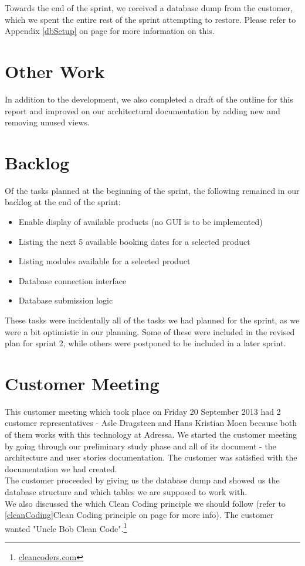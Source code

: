 Towards the end of the sprint, we received a database dump from the customer, which we spent the entire rest of the sprint attempting to restore. Please refer to Appendix \ref{dbSetup} on page \pageref{dbSetup} for more information on this.

\section{Other Work}
In addition to the development, we also completed a draft of the outline for this report and improved on our architectural documentation by adding new and removing unused views.

\section{Backlog}
Of the tasks planned at the beginning of the sprint, the following remained in our backlog at the end of the sprint:
\begin{itemize}
	\item Enable display of available products (no GUI is to be implemented)
	\item Listing the next 5 available booking dates for a selected product
	\item Listing modules available for a selected product
	\item Database connection interface
	\item Database submission logic
\end{itemize}

These tasks were incidentally all of the tasks we had planned for the sprint, as we were a bit optimistic in our planning. Some of these were included in the revised plan for sprint 2, while others were postponed to be included in a later sprint.

\section{Customer Meeting}
This customer meeting which took place on Friday 20 September 2013 had 2 customer representatives - Asle Dragsteen and Hans Kristian Moen because both of them works with this technology at Adressa. 
We started the customer meeting by going through our preliminary study phase and all of its document - the architecture and user stories documentation. The customer was satisfied with the documentation we had created.\\
The customer proceeded by giving us the database dump and showed us the database structure and which tables we are supposed to work with.\\
We also discussed the which Clean Coding principle we should follow (refer to \ref{cleanCoding}Clean Coding principle on page \pageref{cleanCoding} for more info). The customer wanted "Uncle Bob Clean Code".\footnote{\href{http://cleancoders.com}{cleancoders.com}}

